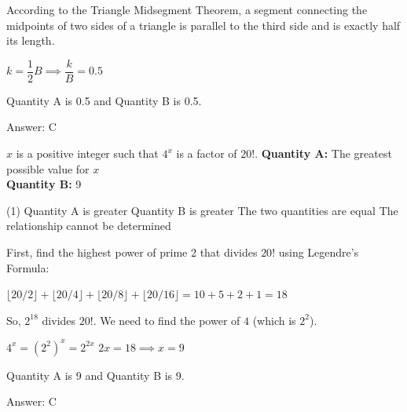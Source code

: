 \documentclass[11pt,paper=a4,answers]{exam}
\begin{document}
\begin{questions}
\begin{solution}
According to the Triangle Midsegment Theorem, a segment connecting the midpoints of two sides of a triangle is parallel to the third side and is exactly half its length.
\vspace{5pt}
\begin{center}
$k = \dfrac{1}{2}B \implies \dfrac{k}{B} = 0.5$
\end{center}
\vspace{5pt}
Quantity A is 0.5 and Quantity B is 0.5.

Answer: \colorbox{yellow!100}{C}
\end{solution}

\vspace{1cm}

\question
$x$ is a positive integer such that $4^x$ is a factor of $20!$.
\vspace{5pt}
\textbf{Quantity A: } The greatest possible value for $x$ \\
\vspace{5pt}
\textbf{Quantity B: } 9

\begin{tasks}(1)
\task[A)] Quantity A is greater
\task[B)] Quantity B is greater
\task[C)] The two quantities are equal
\task[D)] The relationship cannot be determined
\end{tasks}

\begin{solution}
First, find the highest power of prime 2 that divides $20!$ using Legendre's Formula:
\vspace{5pt}
\begin{center}
$\lfloor 20/2 \rfloor + \lfloor 20/4 \rfloor + \lfloor 20/8 \rfloor + \lfloor 20/16 \rfloor = 10 + 5 + 2 + 1 = 18$
\end{center}
\vspace{5pt}
So, $2^{18}$ divides $20!$. We need to find the power of $4$ (which is $2^2$).
\vspace{5pt}
\begin{center}
$4^x = (2^2)^x = 2^{2x}$
\vspace{5pt}
$2x = 18 \implies x = 9$
\end{center}
\vspace{5pt}
Quantity A is 9 and Quantity B is 9.

Answer: \colorbox{yellow!100}{C}
\end{solution}

\vspace{1cm}


\end{questions}
\end{document}
